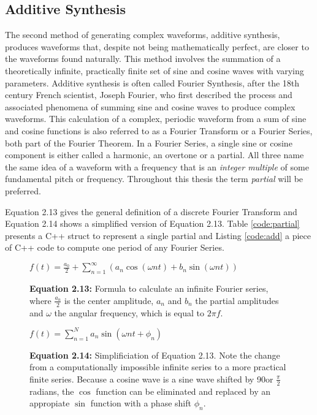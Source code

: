 \begin{table}
\end{table}

\pagebreak

\subsection{Additive Synthesis}

The second method of generating complex waveforms, additive synthesis, produces waveforms that, despite not being mathematically perfect, are closer to the waveforms found naturally. This method involves the summation of a theoretically infinite, practically finite set of sine and cosine waves with varying parameters. Additive synthesis is often called Fourier Synthesis, after the 18th century French scientist, Joseph Fourier, who first described the process and associated phenomena of summing sine and cosine waves to produce complex waveforms. This calculation of a complex, periodic waveform from a sum of sine and cosine functions is also referred to as a Fourier Transform or a Fourier Series, both part of the Fourier Theorem. In a Fourier Series, a single sine or cosine component is either called a harmonic, an overtone or a partial. All three name the same idea of a waveform with a frequency that is an \emph{integer multiple} of some fundamental pitch or frequency.  Throughout this thesis the term \emph{partial} will be preferred.

Equation 2.13 gives the general definition of a discrete Fourier Transform and Equation 2.14 shows a simplified version of Equation 2.13. Table \ref{code:partial} presents a C++ struct to represent a single partial and Listing \ref{code:add} a piece of C++ code to compute one period of any Fourier Series.

\begin{figure}[h!]
  $f(t) = \frac{a_{0}}{2} + \sum\limits_{n=1}^\infty (a_{n} \cos(\omega n t) + b_{n} \sin(\omega n t))$
  \caption*{\textbf{Equation 2.13: }Formula to calculate an infinite Fourier series, where $\frac{a_{n}}{2}$ is the center amplitude, $a_{n}$ and $b_{n}$ the partial amplitudes and $\omega$ the angular frequency, which is equal to $2 \pi f$.}
  \label{fig:fourier1}
\end{figure}

\begin{figure}[h!]
  $f(t) = \sum\limits_{n=1}^N a_{n} \sin(\omega n t + \phi_{n})$
  \caption*{\textbf{Equation 2.14:} Simplificiation of Equation 2.13. Note the change from a computationally impossible infinite series to a more practical finite series. Because a cosine wave is a sine wave shifted by 90\degree or $\frac{\pi}{2}$ radians, the $\cos$ function can be eliminated and replaced by an appropiate $\sin$ function with a phase shift $\phi_{n}$.}
  \label{fig:fourier2}
\end{figure}

